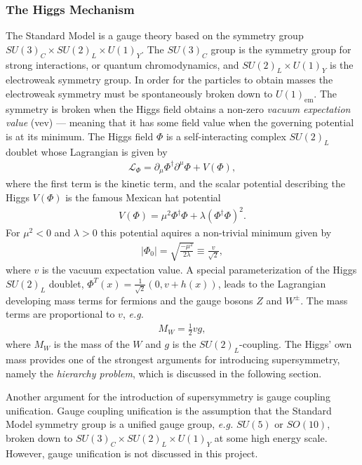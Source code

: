 \documentclass[twoside,english]{uiofysmaster}
\begin{document}
\subsubsection{The Higgs Mechanism}\label{Sec:: phys back : The Higgs Mechanism}

The Standard Model is a gauge theory based on the symmetry group $SU(3)_C \times SU(2)_L \times U(1)_Y$. The $SU(3)_C$ group is the symmetry group for strong interactions, or quantum chromodynamics, and $SU(2)_L \times U(1)_Y$ is the electroweak symmetry group. In order for the particles to obtain masses the electroweak symmetry must be spontaneously broken down to $U(1)_{\mathrm{em}}$. The symmetry is broken when the Higgs field obtains a non-zero \textit{vacuum expectation value} (vev) --- meaning that it has some field value when the governing potential is at its minimum. The Higgs field $\Phi$ is a self-interacting complex $SU(2)_L$ doublet whose Lagrangian is given by
\begin{align}
\mathcal{L}_{\Phi} = \partial_{\mu} \Phi^{\dagger} \partial^{\mu} \Phi + V(\Phi),
\end{align}
where the first term is the kinetic term, and the scalar potential describing the Higgs $V(\Phi)$ is the famous Mexican hat potential
\begin{align}
V(\Phi) = \mu^2 \Phi^{\dagger} \Phi + \lambda (\Phi^{\dagger} \Phi)^2.
\end{align}
For $\mu^2 < 0$ and $\lambda > 0$ this potential aquires a non-trivial minimum given by
\begin{align}
|\Phi_0| = \sqrt{\frac{-\mu^2}{2\lambda}} \equiv \frac{v}{\sqrt{2}},
\end{align}
where $v$ is the vacuum expectation value. A special parameterization of the Higgs $SU(2)_L$ doublet, $\Phi^T(x) = \frac{1}{\sqrt{2}} (0, v + h(x))$, leads to the Lagrangian developing mass terms for fermions and the gauge bosons $Z$ and $W^{\pm}$. The mass terms are proportional to $v$, \textit{e.g.}
\begin{align*}
M_W = \frac{1}{2} v g,
\end{align*}
where $M_W$ is the mass of the $W$ and $g$ is the $SU(2)_L$-coupling. The Higgs' own mass provides one of the strongest arguments for introducing supersymmetry, namely the \textit{hierarchy problem}, which is discussed in the following section. 

Another argument for the introduction of supersymmetry is gauge coupling unification. Gauge coupling unification is the assumption that the Standard Model symmetry group is a unified gauge group, \textit{e.g.} $SU(5)$ or $SO(10)$, broken down to $SU(3)_C \times SU(2)_L \times U(1)_Y$ at some high energy scale. However, gauge unification is not discussed in this project.
\end{document}
